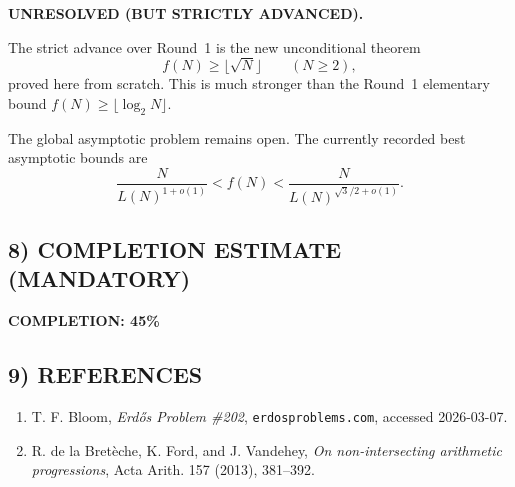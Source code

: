\textbf{UNRESOLVED (BUT STRICTLY ADVANCED).}

The strict advance over Round~1 is the new unconditional theorem
\[
f(N)\ge \lfloor \sqrt N\rfloor \qquad (N\ge 2),
\]
proved here from scratch. This is much stronger than the Round~1 elementary bound $f(N)\ge \lfloor \log_2 N\rfloor$.

The global asymptotic problem remains open. The currently recorded best asymptotic bounds are
\[
\frac{N}{L(N)^{1+o(1)}}<f(N)<\frac{N}{L(N)^{\sqrt 3/2+o(1)}}.
\]

\subsection*{8) COMPLETION ESTIMATE (MANDATORY)}

\textbf{COMPLETION: 45\%}

\subsection*{9) REFERENCES}

\begin{enumerate}
\item T. F. Bloom, \emph{Erd\H{o}s Problem \#202}, \texttt{erdosproblems.com}, accessed 2026-03-07.
\item R. de la Bret\`eche, K. Ford, and J. Vandehey, \emph{On non-intersecting arithmetic progressions}, Acta Arith. 157 (2013), 381--392.
\end{enumerate}

